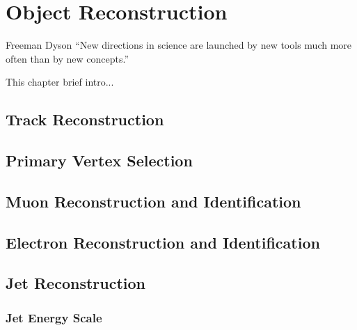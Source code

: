 \chapter{Object Reconstruction} %
\label{cha:object_reconstruction}
\begin{chapquote}
{Freeman Dyson}
``New directions in science are launched by new tools much more often than by new concepts.''
\end{chapquote}
This chapter brief intro...


\section{Track Reconstruction} %
\label{sec:track_reconstruction}


\section{Primary Vertex Selection} %
\label{sec:primary_vertex_selection}


\section{Muon Reconstruction and Identification} %
\label{sec:muon_reconstruction_and_identification}


\section{Electron Reconstruction and Identification} %
\label{sec:electron_reconstruction_and_identification}


\section{Jet Reconstruction} %
\label{sec:jet_reconstruction}


\subsection{Jet Energy Scale} %
\label{sub:jet_energy_scale}

